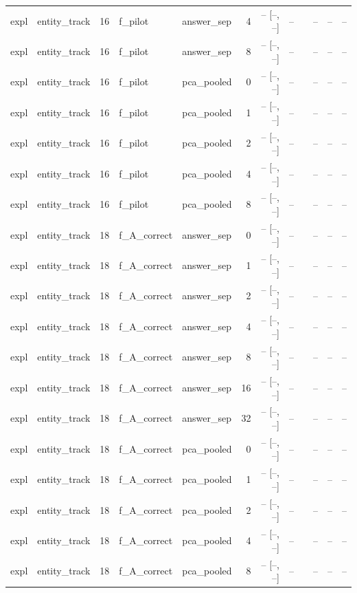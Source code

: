 \begin{tabular}{llrllrrrlrrr}
expl & entity\_track & 16 & f\_pilot & answer\_sep & 4 & -- [--, --] & -- &  & -- & -- & -- \\
expl & entity\_track & 16 & f\_pilot & answer\_sep & 8 & -- [--, --] & -- &  & -- & -- & -- \\
expl & entity\_track & 16 & f\_pilot & pca\_pooled & 0 & -- [--, --] & -- &  & -- & -- & -- \\
expl & entity\_track & 16 & f\_pilot & pca\_pooled & 1 & -- [--, --] & -- &  & -- & -- & -- \\
expl & entity\_track & 16 & f\_pilot & pca\_pooled & 2 & -- [--, --] & -- &  & -- & -- & -- \\
expl & entity\_track & 16 & f\_pilot & pca\_pooled & 4 & -- [--, --] & -- &  & -- & -- & -- \\
expl & entity\_track & 16 & f\_pilot & pca\_pooled & 8 & -- [--, --] & -- &  & -- & -- & -- \\
expl & entity\_track & 18 & f\_A\_correct & answer\_sep & 0 & -- [--, --] & -- &  & -- & -- & -- \\
expl & entity\_track & 18 & f\_A\_correct & answer\_sep & 1 & -- [--, --] & -- &  & -- & -- & -- \\
expl & entity\_track & 18 & f\_A\_correct & answer\_sep & 2 & -- [--, --] & -- &  & -- & -- & -- \\
expl & entity\_track & 18 & f\_A\_correct & answer\_sep & 4 & -- [--, --] & -- &  & -- & -- & -- \\
expl & entity\_track & 18 & f\_A\_correct & answer\_sep & 8 & -- [--, --] & -- &  & -- & -- & -- \\
expl & entity\_track & 18 & f\_A\_correct & answer\_sep & 16 & -- [--, --] & -- &  & -- & -- & -- \\
expl & entity\_track & 18 & f\_A\_correct & answer\_sep & 32 & -- [--, --] & -- &  & -- & -- & -- \\
expl & entity\_track & 18 & f\_A\_correct & pca\_pooled & 0 & -- [--, --] & -- &  & -- & -- & -- \\
expl & entity\_track & 18 & f\_A\_correct & pca\_pooled & 1 & -- [--, --] & -- &  & -- & -- & -- \\
expl & entity\_track & 18 & f\_A\_correct & pca\_pooled & 2 & -- [--, --] & -- &  & -- & -- & -- \\
expl & entity\_track & 18 & f\_A\_correct & pca\_pooled & 4 & -- [--, --] & -- &  & -- & -- & -- \\
expl & entity\_track & 18 & f\_A\_correct & pca\_pooled & 8 & -- [--, --] & -- &  & -- & -- & -- \\

\end{tabular}
